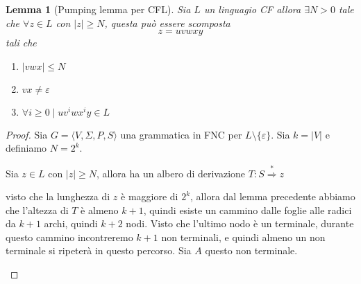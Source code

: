 \documentclass[12pt]{report}
\newtheorem{lemma}{Lemma}
\theoremstyle{definition}
\begin{document}
\begin{lemma}[Pumping lemma per CFL]
	Sia $L$ un linguagio CF allora $\exists N > 0$ tale che $\forall z \in L$ con $|z| \geq N$, questa può essere scomposta
	$$ z = uvwxy $$
	tali che
	\begin{enumerate}
		\item $|vwx| \leq N $
		\item $vx \neq \varepsilon $
		\item $\forall i \geq 0 \mid uv^i w x^i y \in L$
	\end{enumerate}
\end{lemma}
\begin{proof}
	Sia $G = \langle V, \Sigma, P, S \rangle$ una grammatica in FNC per $L \setminus \{ \varepsilon \}$.
	Sia $k = | V | $ e definiamo $N = 2^k$.

	Sia $z \in L$ con $|z| \geq N$, allora ha un albero di derivazione $T : S \overset{*}{\Rightarrow} z$
	\begin{center}
	\end{center}
	visto che la lunghezza di $z$ è maggiore di $2^k$, allora dal lemma precedente abbiamo che l'altezza di $T$ è almeno $k + 1$, quindi esiste un cammino dalle foglie alle radici da $k + 1$ archi, quindi $k + 2$ nodi.
	Visto che l'ultimo nodo è un terminale, durante questo cammino incontreremo $k + 1$ non terminali, e quindi almeno un non terminale si ripeterà in questo percorso.
	Sia $A$ questo non terminale.
	\begin{figure}[H]
		\centering
		\begin{subfigure}{\textwidth}
			\centering
\end{subfigure}
\end{figure}
\end{proof}
\end{document}

